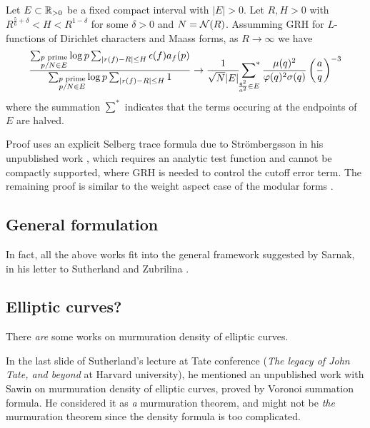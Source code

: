 \begin{theorem}
    Let $E \subset \mathbb{R}_{>0}$ be a fixed compact interval with $|E| > 0$.
    Let $R, H > 0$ with $R^{\frac{5}{6} + \delta} < H < R^{1 - \delta}$ for some $\delta > 0$ and $N = \mathcal{N}(R)$.
    Assumming GRH for $L$-functions of Dirichlet characters and Maass forms, as $R \to \infty$ we have 
    \begin{equation}
        \frac{\sum_{\substack{p\text{ prime} \\ p / N \in E}} \log p \sum_{|r(f) - R| \le H} \epsilon(f) a_{f}(p)}{\sum_{\substack{p\text{ prime} \\ p / N \in E}} \log p \sum_{|r(f) - R| \le H} 1} \to \frac{1}{\sqrt{N}|E|}  \sideset{}{^{*}}\sum_{\frac{q^2}{a^2} \in E}  \frac{\mu(q)^2}{\varphi(q)^2 \sigma(q)} \left(\frac{a}{q}\right)^{-3}
    \end{equation}
    where the summation $\sum^{*}$ indicates that the terms occuring at the endpoints of $E$ are halved. 
\end{theorem}

Proof uses an explicit Selberg trace formula due to Str\"ombergsson in his unpublished work \cite{strombergsson}, which requires an analytic test function and cannot be compactly supported, where GRH is needed to control the cutoff error term.
The remaining proof is similar to the weight aspect case of the modular forms \cite{bober2023murmurations}.

\subsection{General formulation}

In fact, all the above works fit into the general framework suggested by Sarnak, in his letter to Sutherland and Zubrilina \cite{sarnak}.

\subsection{Elliptic curves?}

There \emph{are} some works on murmuration density of elliptic curves.

In the last slide of Sutherland's lecture \cite{sutherland} at Tate conference (\emph{The legacy of John Tate, and beyond} at Harvard university), he mentioned an unpublished work with Sawin on murmuration density of elliptic curves, proved by Voronoi summation formula.
He considered it as \emph{a} murmuration theorem, and might not be \emph{the} murmuration theorem since the density formula is too complicated.

